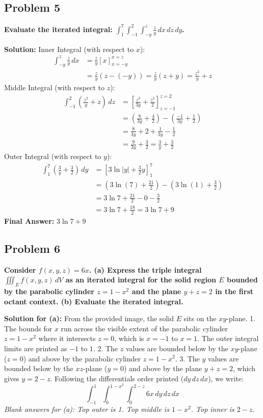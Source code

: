 \documentclass[12pt]{article}
\begin{document}
\vspace{0.5cm}
\subsection*{Problem 5}
\textbf{Evaluate the iterated integral: $\int_{1}^{7} \int_{-1}^{2} \int_{-y}^{z} \frac{z}{y} \, dx \, dz \, dy$.}

\textbf{Solution:}
Inner Integral (with respect to $x$):
\begin{align*} 
\int_{-y}^{z} \frac{z}{y} \, dx &= \frac{z}{y} \left[ x \right]_{x=-y}^{x=z} \\
&= \frac{z}{y} (z - (-y)) = \frac{z}{y}(z + y) = \frac{z^2}{y} + z
\end{align*}
Middle Integral (with respect to $z$):
\begin{align*} 
\int_{-1}^{2} \left( \frac{z^2}{y} + z \right) \, dz &= \left[ \frac{z^3}{3y} + \frac{z^2}{2} \right]_{z=-1}^{z=2} \\
&= \left( \frac{8}{3y} + \frac{4}{2} \right) - \left( \frac{-1}{3y} + \frac{1}{2} \right) \\
&= \frac{8}{3y} + 2 + \frac{1}{3y} - \frac{1}{2} \\
&= \frac{9}{3y} + \frac{3}{2} = \frac{3}{y} + \frac{3}{2}
\end{align*}
Outer Integral (with respect to $y$):
\begin{align*} 
\int_{1}^{7} \left( \frac{3}{y} + \frac{3}{2} \right) \, dy &= \left[ 3 \ln|y| + \frac{3}{2}y \right]_{1}^{7} \\
&= \left( 3 \ln(7) + \frac{21}{2} \right) - \left( 3 \ln(1) + \frac{3}{2} \right) \\
&= 3 \ln 7 + \frac{21}{2} - 0 - \frac{3}{2} \\
&= 3 \ln 7 + \frac{18}{2} = 3 \ln 7 + 9
\end{align*}
\textbf{Final Answer:} $3 \ln 7 + 9$

\vspace{0.5cm}
\subsection*{Problem 6}
\textbf{Consider $f(x, y, z) = 6x$. (a) Express the triple integral $\iiint_E f(x, y, z) \, dV$ as an iterated integral for the solid region $E$ bounded by the parabolic cylinder $z = 1 - x^2$ and the plane $y + z = 2$ in the first octant context. (b) Evaluate the iterated integral.}

\textbf{Solution for (a):}
From the provided image, the solid $E$ sits on the $xy$-plane.
1. The bounds for $x$ run across the visible extent of the parabolic cylinder $z = 1-x^2$ where it intersects $z=0$, which is $x = -1$ to $x = 1$. The outer integral limits are printed as $-1$ to $1$.
2. The $z$ values are bounded below by the $xy$-plane ($z=0$) and above by the parabolic cylinder $z = 1 - x^2$.
3. The $y$ values are bounded below by the $xz$-plane ($y=0$) and above by the plane $y + z = 2$, which gives $y = 2 - z$.
Following the differentials order printed ($dy \, dz \, dx$), we write:
\[ \int_{-1}^{1} \int_{0}^{1-x^2} \int_{0}^{2-z} 6x \, dy \, dz \, dx \]
\textit{Blank answers for (a): Top outer is 1. Top middle is $1-x^2$. Top inner is $2-z$.}
\end{document}
